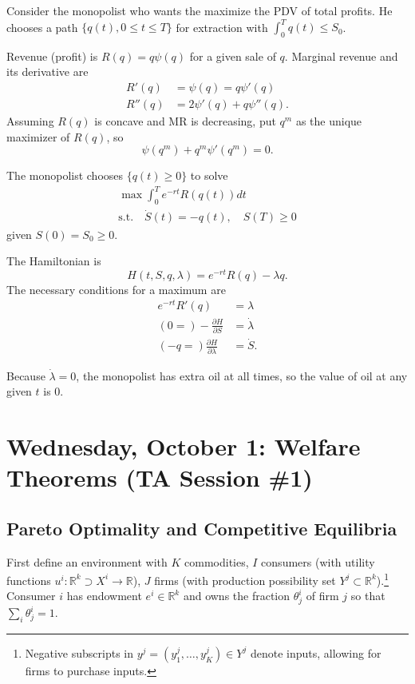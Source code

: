 \documentclass{tufte-handout}
\newcommand*\R{\mathbb{R}}
\theoremstyle{definition}
\begin{document}
Consider the monopolist who wants the maximize the PDV of total profits. 
He chooses a path $\{q(t), 0 \le t \le T\}$ for extraction with $\int_{0}^{T} q(t) \le S_0$.

Revenue (profit) is $R(q) = q \psi(q)$ for a given sale of $q$. Marginal revenue and its derivative are 
\begin{align*}
	R'(q) &= \psi(q) = q \psi'(q) \\
	R''(q) &= 2\psi'(q) + q \psi''(q).
\end{align*}
Assuming $R(q)$ is concave and MR is decreasing, put $q^m$ as the unique maximizer of $R(q)$, so \[
	\psi(q^m) + q^m \psi'(q^m) = 0
.\] 

The monopolist chooses $\{q(t) \ge 0\}$ to solve
\begin{align*}
	\max \int_{0}^{T} e^{-rt} R(q(t)) dt \\
	\text{s.t.} \quad \dot{S}(t) = -q(t), \quad S(T) \ge 0 
\end{align*} given $S(0) = S_0 \ge 0$.

The Hamiltonian is \[
	H(t,S,q,\lambda) = e^{-rt}R(q) - \lambda q
.\] The necessary conditions for a maximum are
\begin{align*}
	e^{-rt}R'(q) &= \lambda \\
	(0 = ) -\frac{\partial H}{\partial S} &= \dot{\lambda} \\
	(-q = ) \frac{\partial H}{\partial \lambda} &= \dot{S}
.\end{align*}

Because $\dot{\lambda} = 0$, the monopolist has extra oil at all times, so the value of oil at any given $t$ is $0$.

\section{Wednesday, October 1: Welfare Theorems (TA Session \#1)}

\subsection{Pareto Optimality and Competitive Equilibria}

First define an environment with $K$ commodities, $I$ consumers (with utility functions $u^i: \R^k \supset X^i \to \R$), $J$ firms (with production possibility set $Y^j \subset \R^k$).\footnote{Negative subscripts in $y^j = \left( y_1^j,\ldots,y_K^j \right) \in Y^j$ denote inputs, allowing for firms to purchase inputs.} Consumer $i$ has endowment $e^i \in \R^k$ and owns the fraction $\theta_j^i$ of firm $j$ so that $\sum_i \theta_j^i = 1$.
\end{document}
